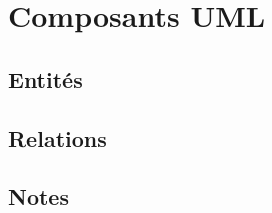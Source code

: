 
\chapter{Composants UML}
\label{ch:composants_uml}

\section{Entités}
\label{sec:entites}

\section{Relations}
\label{sec:relations}

\section{Notes}
\label{sec:notes}